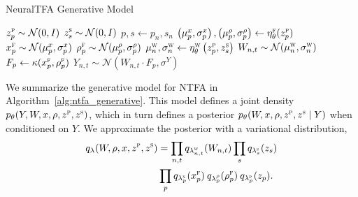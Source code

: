 \documentclass[twoside]{article}
\newcommand{\scf}{\textsc{f}}
\newcommand{\scw}{\textsc{w}}
\newcommand{\scp}{\textsc{p}}
\newcommand{\scs}{\textsc{s}}
\begin{document}
\begin{algorithm}[t]
   \caption{NeuralTFA Generative Model}
   \label{alg:ntfa_generative}
\begin{algorithmic}[1]
     
     
    \State $z_{p}^\scp \sim \mathcal{N}(0,I)$ 
\EndFor
{}
    \State $z_{s}^\scs \sim \mathcal{N}(0,I)$
\EndFor
{} 
    \State $p,s \leftarrow p_n, s_n$
    \State $\left( \mu^{x}_{p}, \sigma^{x}_{p}\right), \left( \mu^{\rho}_{p} , \sigma^{\rho}_{p} \right) \leftarrow \eta^\scf_\theta (z^\scp_p)$
    \State $x^\scf_p \sim \mathcal{N}(\mu^{x}_{p}, \sigma^{x}_{p})$
    \State $\rho^\scf_{p} \sim \mathcal{N}(\mu^{\rho}_{p}, \sigma^{\rho}_{p})$
    \State $\mu^{\textsc{w}}_{n}, \sigma^{\textsc{w}}_{n} \leftarrow \eta^\scw_\theta \left( z^\scp_p, z^\scs_s \right)$
        \State $W_{n,t} \sim \mathcal{N}(\mu^{\textsc{w}}_{n}, \sigma^{\textsc{w}}_{n})$ 
        \State $F_{p} \leftarrow \kappa(x^\scf_p, \rho^\scf_p)$
        \State $Y_{n,t} \sim \mathcal{N}(W_{n,t}\cdot F_p, \sigma^Y)$
    \EndFor
  \EndFor
\end{algorithmic}
\end{algorithm}
We summarize the generative model for NTFA in Algorithm~\ref{alg:ntfa_generative}. This model defines a joint density $p_{\theta}(Y, W, x, \rho, z^\scp, z^\scs)$, which in turn defines a posterior $p_{\theta}(W, x, \rho, z^\scp, z^\scs \mid Y)$ when conditioned on $Y$. We approximate the posterior with a variational distribution, 
\begin{align}
    \begin{split}
    q_{\lambda}(W, \rho, x, z^\scp, z^\scs)
    &=
    \prod_{n,t} 
    q_{ \lambda^\scw_{n,t}}(W_{n,t})
    \prod_{s}
    q_{\lambda^\textsc{s}_{s}}(z_s) \\
    & \prod_{p}
    q_{\lambda^\textsc{x}_{p}}(x^\scf_p) \:
    q_{\lambda^\rho_{p}}(\rho^\scf_p) \:
    q_{\lambda^\textsc{p}_{p}}(z_p).
    \end{split}
\end{align}
\end{document}
